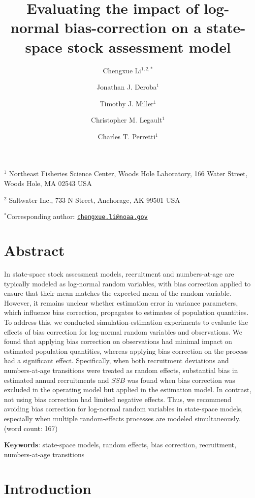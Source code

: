\documentclass[
  12pt,
]{article}
\title{Evaluating the impact of log-normal bias-correction on a
state-space stock assessment model}
\author{Chengxue Li\(^{1,2,*}\) \and Jonathan J.
Deroba\(^1\) \and Timothy J. Miller\(^1\) \and Christopher M.
Legault\(^1\) \and Charles T. Perretti\(^1\)}
\date{}
\begin{document}
\maketitle

\(^1\) Northeast Fisheries Science Center, Woods Hole Laboratory, 166
Water Street, Woods Hole, MA 02543 USA

\(^2\) Saltwater Inc., 733 N Street, Anchorage, AK 99501 USA

\(^*\)Corresponding author:
\href{mailto:chengxue.li@noaa.gov}{\nolinkurl{chengxue.li@noaa.gov}}

\pagebreak

\section*{Abstract}\label{abstract}

In state-space stock assessment models, recruitment and numbers-at-age
are typically modeled as log-normal random variables, with bias
correction applied to ensure that their mean matches the expected mean
of the random variable. However, it remains unclear whether estimation
error in variance parameters, which influence bias correction,
propagates to estimates of population quantities. To address this, we
conducted simulation-estimation experiments to evaluate the effects of
bias correction for log-normal random variables and observations. We
found that applying bias correction on observations had minimal impact
on estimated population quantities, whereas applying bias correction on
the process had a significant effect. Specifically, when both
recruitment deviations and numbers-at-age transitions were treated as
random effects, substantial bias in estimated annual recruitments and
\(SSB\) was found when bias correction was excluded in the operating
model but applied in the estimation model. In contrast, not using bias
correction had limited negative effects. Thus, we recommend avoiding
bias correction for log-normal random variables in state-space models,
especially when multiple random-effects processes are modeled
simultaneously. (word count: 167)

\textbf{Keywords}: state-space models, random effects, bias correction,
recruitment, numbers-at-age transitions

\pagebreak

\section{Introduction}\label{introduction}
\end{document}
